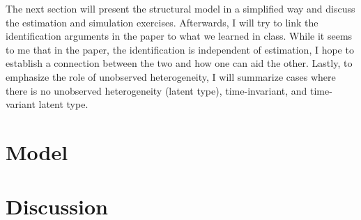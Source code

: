 \documentclass[10pt]{article}
\begin{document}
The next section will present the structural model in a simplified way and discuss the estimation and simulation exercises. Afterwards, I will try to link the identification arguments in the paper to what we learned in class. While it seems to me that in the paper, the identification is independent of estimation, I hope to establish a connection between the two and how one can aid the other. Lastly, to emphasize the role of unobserved heterogeneity, I will summarize cases where there is no unobserved heterogeneity (latent type), time-invariant, and time-variant latent type.

\section{Model}


\section{Discussion}

\pagebreak \newpage 
\end{document}
